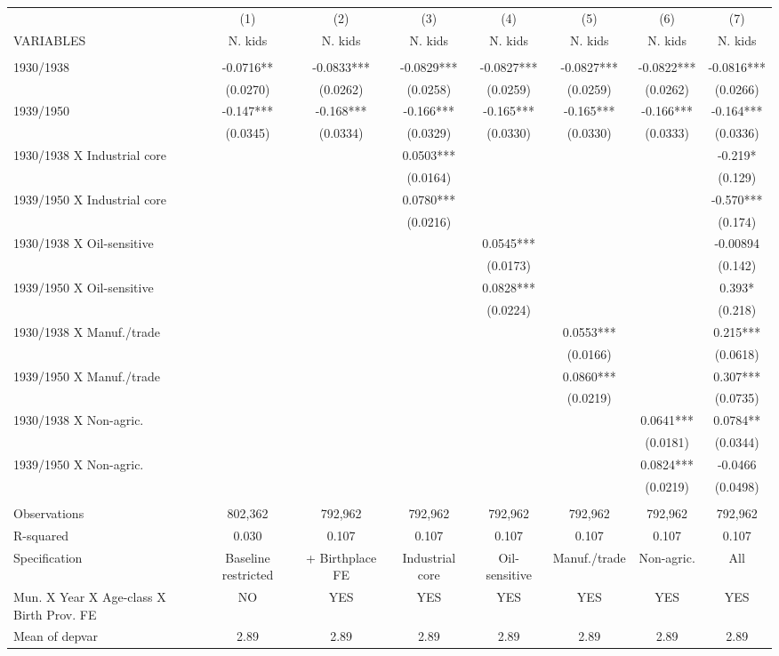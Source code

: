 \begin{tabular}{lccccccc} \hline
 & (1) & (2) & (3) & (4) & (5) & (6) & (7) \\
VARIABLES & N. kids & N. kids & N. kids & N. kids & N. kids & N. kids & N. kids \\ \hline
 &  &  &  &  &  &  &  \\
1930/1938 & -0.0716** & -0.0833*** & -0.0829*** & -0.0827*** & -0.0827*** & -0.0822*** & -0.0816*** \\
 & (0.0270) & (0.0262) & (0.0258) & (0.0259) & (0.0259) & (0.0262) & (0.0266) \\
1939/1950 & -0.147*** & -0.168*** & -0.166*** & -0.165*** & -0.165*** & -0.166*** & -0.164*** \\
 & (0.0345) & (0.0334) & (0.0329) & (0.0330) & (0.0330) & (0.0333) & (0.0336) \\
1930/1938 X Industrial core &  &  & 0.0503*** &  &  &  & -0.219* \\
 &  &  & (0.0164) &  &  &  & (0.129) \\
1939/1950 X Industrial core &  &  & 0.0780*** &  &  &  & -0.570*** \\
 &  &  & (0.0216) &  &  &  & (0.174) \\
1930/1938 X Oil-sensitive &  &  &  & 0.0545*** &  &  & -0.00894 \\
 &  &  &  & (0.0173) &  &  & (0.142) \\
1939/1950 X Oil-sensitive &  &  &  & 0.0828*** &  &  & 0.393* \\
 &  &  &  & (0.0224) &  &  & (0.218) \\
1930/1938 X Manuf./trade &  &  &  &  & 0.0553*** &  & 0.215*** \\
 &  &  &  &  & (0.0166) &  & (0.0618) \\
1939/1950 X Manuf./trade &  &  &  &  & 0.0860*** &  & 0.307*** \\
 &  &  &  &  & (0.0219) &  & (0.0735) \\
1930/1938 X Non-agric. &  &  &  &  &  & 0.0641*** & 0.0784** \\
 &  &  &  &  &  & (0.0181) & (0.0344) \\
1939/1950 X Non-agric. &  &  &  &  &  & 0.0824*** & -0.0466 \\
 &  &  &  &  &  & (0.0219) & (0.0498) \\
 &  &  &  &  &  &  &  \\
Observations & 802,362 & 792,962 & 792,962 & 792,962 & 792,962 & 792,962 & 792,962 \\
R-squared & 0.030 & 0.107 & 0.107 & 0.107 & 0.107 & 0.107 & 0.107 \\
Specification & Baseline restricted & + Birthplace FE & Industrial core & Oil-sensitive & Manuf./trade & Non-agric. & All \\
Mun. X Year X Age-class X Birth Prov. FE & NO & YES & YES & YES & YES & YES & YES \\
 Mean of depvar & 2.89 & 2.89 & 2.89 & 2.89 & 2.89 & 2.89 & 2.89 \\ \hline
\end{tabular}

